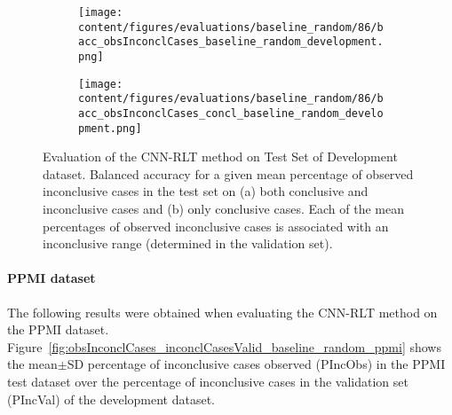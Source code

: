 \begin{figure}[ht]
  \begin{subfigure}{0.9\textwidth}
    \centering
    \texttt{[image: content/figures/evaluations/baseline\_random/86/bacc\_obsInconclCases\_baseline\_random\_development.png]}
    \subcaption{}
    \label{fig:bacc_obsInconclCases_baseline_random_development}
  \end{subfigure}
  \hfill
  \begin{subfigure}{0.9\textwidth}
    \centering
    \texttt{[image: content/figures/evaluations/baseline\_random/86/bacc\_obsInconclCases\_concl\_baseline\_random\_development.png]}
    \subcaption{}
    \label{fig:bacc_obsInconclCases_concl_baseline_random_development}
  \end{subfigure}

  \caption{Evaluation of the CNN-RLT method on Test Set of Development dataset.
  Balanced accuracy for a given mean percentage of observed inconclusive cases in the test set on 
  (a) both conclusive and inconclusive cases and (b) only conclusive cases. 
  Each of the mean percentages of observed inconclusive cases is associated with an inconclusive range (determined in the validation set). }
  \label{fig:bacc_obsInconclCases_baseline_random_development_full}
\end{figure}





\paragraph{PPMI dataset}

The following results were obtained when evaluating the CNN-RLT method on the PPMI dataset.
Figure~\ref{fig:obsInconclCases_inconclCasesValid_baseline_random_ppmi} shows the
mean$\pm$SD percentage of inconclusive cases observed (PIncObs) in the PPMI test dataset 
over the percentage of inconclusive cases in the validation set (PIncVal) of the development dataset.

